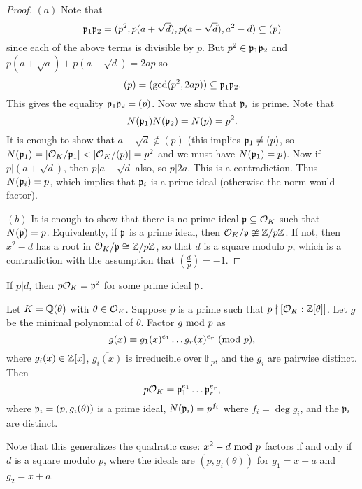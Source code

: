 \begin{proof}
  $(a)$ Note that
  \[
    \mathfrak{p}_1 \mathfrak{p}_2 = (p^2, p(a + \sqrt{d}), p(a - \sqrt{d}), a^2 - d) \subseteq (p)
  \]
  since each of the above terms is divisible by $p$.
  But $p^2 \in \mathfrak{p}_1 \mathfrak{p}_2$ and
  $p(a + \sqrt{a}) + p(a - \sqrt{d}) = 2ap$ so
  \[
    (p) = (\gcd(p^2, 2ap)) \subseteq \mathfrak{p}_1 \mathfrak{p}_2.
  \]
  This gives the equality $\mathfrak{p}_1 \mathfrak{p}_2 = (p)$. Now we
  show that $\mathfrak{p}_i$ is prime. Note that
  \[
    N(\mathfrak{p}_1) N(\mathfrak{p}_2) = N(p) = p^2.
  \]
  It is enough to show that $a + \sqrt{d} \notin (p)$
  (this implies $\mathfrak{p}_1 \ne (p)$, so
  $N(\mathfrak{p}_1) = |\mathcal{O}_K / \mathfrak{p}_1| < |\mathcal{O}_K / (p)| = p^2$ and
  we must have $N(\mathfrak{p}_1) = p$).
  Now if $p | (a + \sqrt{d})$, then
  $p | a - \sqrt{d}$ also, so $p | 2a$. This is a
  contradiction. Thus $N(\mathfrak{p}_i) = p$, which implies
  that $\mathfrak{p}_i$ is a prime ideal (otherwise the norm
  would factor).

  $(b)$ It is enough to show that there is no prime
  ideal $\mathfrak{p} \subseteq \mathcal{O}_K$ such that $N(\mathfrak{p}) = p$.
  Equivalently, if $\mathfrak{p}$ is a prime ideal, then
  $\mathcal{O}_K / \mathfrak{p} \ncong \mathbb{Z} / p\mathbb{Z}$.  If not, then $x^2 - d$
  has a root in $\mathcal{O}_K / \mathfrak{p} \cong \mathbb{Z} / p\mathbb{Z}$, so that
  $d$ is a square modulo $p$, which is a contradiction
  with the assumption that $(\frac{d}{p}) = -1$.
\end{proof}

\begin{exercise}
  If $p | d$, then $p \mathcal{O}_K = \mathfrak{p}^2$ for some prime ideal
  $\mathfrak{p}$.
\end{exercise}

\begin{theorem}[Kummer]
  Let $K = \mathbb{Q}(\theta)$ with $\theta \in \mathcal{O}_K$.
  Suppose $p$ is a prime such that $p \nmid [\mathcal{O}_K : \mathbb{Z}[\theta]]$.
  Let $g$ be the minimal polynomial of $\theta$.
  Factor $g \ {\mathrm{mod}\ p}$ as
  \[
    g(x) \equiv g_1(x)^{e_1} \dots g_r(x)^{e_r} \ (\mathrm{mod}\ p),
  \]
  where $g_i(x) \in \mathbb{Z}[x]$, $\overline{g_i(x)}$ is
  irreducible over $\mathbb{F}_p$, and the
  $g_i$ are pairwise distinct. Then
  \[
    p \mathcal{O}_K = \mathfrak{p}_1^{e_1} \dots \mathfrak{p}_r^{e_r},
  \]
  where $\mathfrak{p}_i = (p, g_i(\theta))$ is a prime ideal,
  $N(\mathfrak{p}_i) = p^{f_i}$ where
  $f_i = \deg g_i$, and the $\mathfrak{p}_i$ are distinct.
\end{theorem}

\begin{remark}
  Note that this generalizes the quadratic case:
  $x^2 - d \ {\mathrm{mod}\ p}$ factors if and only if $d$ is a
  square modulo $p$, where
  the ideals are $(p, g_i(\theta))$ for
  $g_1 = x - a$ and $g_2 = x + a$.
\end{remark}
